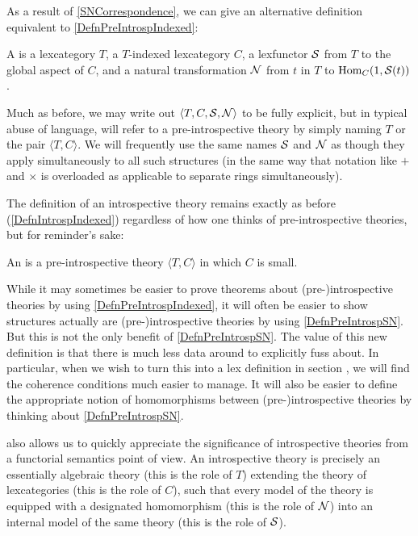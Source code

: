 \documentclass[./main.tex]{subfiles}
\begin{document}
As a result of \cref{SNCorrespondence}, we can give an alternative definition equivalent to \cref{DefnPreIntrospIndexed}:

\begin{definition}\label{DefnPreIntrospSN}
A  is a lexcategory $T$, a $T$-indexed lexcategory $C$, a lexfunctor $\mathcal{S}$ from $T$ to the global aspect of $C$, and a natural transformation $\mathcal{N}$ from $t$ in $T$ to $\operatorname{Hom}_C(1, \mathcal{S}(t))$.
\end{definition}

Much as before, we may write out $\langle T, C, \mathcal{S}, \mathcal{N} \rangle$ to be fully explicit, but in typical abuse of language, will refer to a pre-introspective theory by simply naming $T$ or the pair $\langle T, C\rangle$. We will frequently use the same names $\mathcal{S}$ and $\mathcal{N}$ as though they apply simultaneously to all such structures (in the same way that notation like $+$ and $\times$ is overloaded as applicable to separate rings simultaneously).

The definition of an introspective theory remains exactly as before (\cref{DefnIntrospIndexed}) regardless of how one thinks of pre-introspective theories, but for reminder's sake:

\begin{definition} \label{DefnIntrospSN}
An  is a pre-introspective theory $\langle T, C \rangle$ in which $C$ is small.
\end{definition}

While it may sometimes be easier to prove theorems about (pre-)introspective theories by using \cref{DefnPreIntrospIndexed}, it will often be easier to show structures actually are (pre-)introspective theories by using \cref{DefnPreIntrospSN}. But this is not the only benefit of \cref{DefnPreIntrospSN}. The value of this new definition is that there is much less data around to explicitly fuss about. In particular, when we wish to turn this into a lex definition in section \TODO, we will find the coherence conditions much easier to manage. It will also be easier to define the appropriate notion of homomorphisms between (pre-)introspective theories by thinking about \cref{DefnPreIntrospSN}.

 also allows us to quickly appreciate the significance of introspective theories from a functorial semantics point of view. An introspective theory is precisely an essentially algebraic theory (this is the role of $T$) extending the theory of lexcategories (this is the role of $C$), such that every model of the theory is equipped with a designated homomorphism (this is the role of $\mathcal{N}$) into an internal model of the same theory (this is the role of $\mathcal{S}$).
\end{document}
